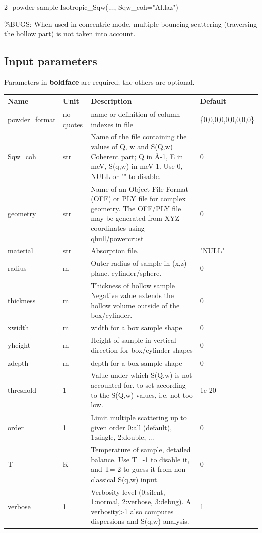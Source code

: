 2- powder sample Isotropic\_Sqw(..., Sqw\_coh="Al.laz")

\%BUGS: When used in concentric mode, multiple bouncing scattering (traversing the hollow part) is not taken into account.

\subsection*{Input parameters}
Parameters in \textbf{boldface} are required; the others are optional.

\begin{longtable}{p{}p{}p{}p{}}
\toprule
\textbf{Name} & \textbf{Unit} & \textbf{Description} & \textbf{Default} \\
\midrule
\endhead
powder\_format & no quotes & name or definition of column indexes in file & \{0,0,0,0,0,0,0,0,0\} \\
Sqw\_coh & str & Name of the file containing the values of Q, w and S(Q,w) Coherent part; Q in \AA{}-1, E in meV, S(q,w) in meV-1. Use 0, NULL or "" to disable. & 0 \\
geometry & str & Name of an Object File Format (OFF) or PLY file for complex geometry. The OFF/PLY file may be generated from XYZ coordinates using qhull/powercrust & 0 \\
material & str & Absorption file. & "NULL" \\
radius & m & Outer radius of sample in (x,z) plane. cylinder/sphere. & 0 \\
thickness & m & Thickness of hollow sample Negative value extends the hollow volume outside of the box/cylinder. & 0 \\
xwidth & m & width for a box sample shape & 0 \\
yheight & m & Height of sample in vertical direction for box/cylinder shapes & 0 \\
zdepth & m & depth for a box sample shape & 0 \\
threshold & 1 & Value under which S(Q,w) is not accounted for. to set according to the S(Q,w) values, i.e. not too low. & 1e-20 \\
order & 1 & Limit multiple scattering up to given order 0:all (default), 1:single, 2:double, ... & 0 \\
T & K & Temperature of sample, detailed balance. Use T=-1 to disable it, and T=-2 to guess it from non-classical S(q,w) input. & 0 \\
verbose & 1 & Verbosity level (0:silent, 1:normal, 2:verbose, 3:debug). A verbosity\textgreater{}1 also computes dispersions and S(q,w) analysis. & 1 \\

\end{longtable}
